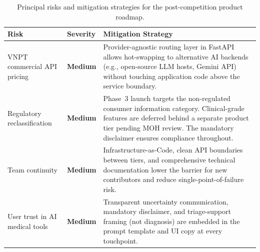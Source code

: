 \begin{table}[htbp]
  \centering
  \caption{Principal risks and mitigation strategies for the post-competition
    product roadmap.}
  \label{tab:risk-matrix}
  \setlength{\tabcolsep}{6pt}
  \renewcommand{\arraystretch}{1.4}
  \small
  \begin{tabular}{@{} p{3.1cm} p{2.1cm} p{7.0cm} @{}}
    \toprule
    \textbf{Risk} & \textbf{Severity} & \textbf{Mitigation Strategy} \\
    \midrule

    VNPT commercial API pricing &
    \textcolor{clav-amber}{\textbf{Medium}} &
    Provider-agnostic routing layer in FastAPI allows hot-swapping to
    alternative AI backends (e.g., open-source LLM hosts, Gemini API)
    without touching application code above the service boundary. \\[4pt]

    Regulatory reclassification &
    \textcolor{clav-amber}{\textbf{Medium}} &
    Phase~3 launch targets the non-regulated consumer information category.
    Clinical-grade features are deferred behind a separate product tier
    pending MOH review. The mandatory disclaimer ensures compliance
    throughout. \\[4pt]

    Team continuity &
    \textcolor{clav-amber}{\textbf{Medium}} &
    Infrastructure-as-Code, clean API boundaries between tiers, and
    comprehensive technical documentation lower the barrier for new
    contributors and reduce single-point-of-failure risk. \\[4pt]

    User trust in AI medical tools &
    \textcolor{clav-amber}{\textbf{Medium}} &
    Transparent uncertainty communication, mandatory disclaimer, and
    triage-support framing (not diagnosis) are embedded in the prompt
    template and UI copy at every touchpoint. \\

    \bottomrule
  \end{tabular}
\end{table}

